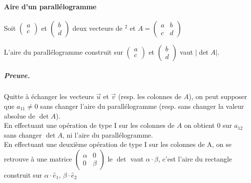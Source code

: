 \paragraph{Aire d'un parallélogramme}
Soit $\begin{pmatrix} a \\ c \end{pmatrix}$ et $\begin{pmatrix} b \\ d \end{pmatrix}$ deux vecteurs de \R$^2$ et $A = \begin{pmatrix}
    a & b \\
    c & d
\end{pmatrix}$
\begin{theorem}
    L'aire du parallélogramme construit sur $\begin{pmatrix} a \\ c \end{pmatrix}$ et $\begin{pmatrix} b \\ d \end{pmatrix}$ vaut $|\det A|$.
\end{theorem}

\subparagraph{Preuve.}
Quitte à échanger les vecteurs $\vec{u}$ et $\vec{v}$ (resp. les colonnes de $A$), on peut supposer que $a_{11} \neq 0$ sans changer l'aire du parallélogramme (resp. sans changer la valeur absolue de $\det A$).
\\
En effectuant une opération de type I sur les colonnes de $A$ on obtient $0$ sur $a_{12}$ sans changer $\det A$, ni l'aire du parallélogramme.
\\
En effectuant une deuxième opération de type I sur les colonnes de A, on se retrouve à une matrice $\begin{pmatrix}
    \alpha & 0\\
    0 & \beta
\end{pmatrix}$ le $\det$ vaut $\alpha \cdot \beta$, c'est l'aire du rectangle construit sur $\alpha \cdot \hat{e}_1$, $\beta\cdot\hat{e}_2$


